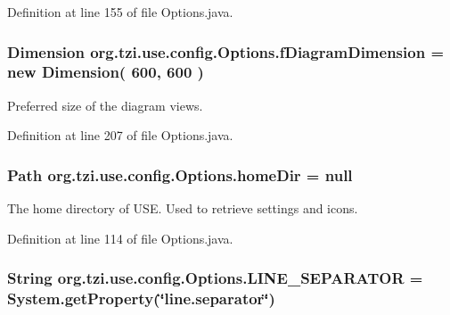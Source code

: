 Definition at line 155 of file Options.\-java.

\hypertarget{classorg_1_1tzi_1_1use_1_1config_1_1_options_a05840ffa842dd9515300f3443439d9f2}{
\subsubsection[{f\-Diagram\-Dimension}]{\setlength{\rightskip}{0pt plus 5cm}Dimension org.\-tzi.\-use.\-config.\-Options.\-f\-Diagram\-Dimension = new Dimension( 600, 600 )\hspace{0.3cm}{\ttfamily [static]}}}\label{classorg_1_1tzi_1_1use_1_1config_1_1_options_a05840ffa842dd9515300f3443439d9f2}
Preferred size of the diagram views. 

Definition at line 207 of file Options.\-java.

\hypertarget{classorg_1_1tzi_1_1use_1_1config_1_1_options_ad29865f9afb2d693e5376ca494b9d13c}{
\subsubsection[{home\-Dir}]{\setlength{\rightskip}{0pt plus 5cm}Path org.\-tzi.\-use.\-config.\-Options.\-home\-Dir = null\hspace{0.3cm}{\ttfamily [static]}}}\label{classorg_1_1tzi_1_1use_1_1config_1_1_options_ad29865f9afb2d693e5376ca494b9d13c}
The home directory of U\-S\-E. Used to retrieve settings and icons. 

Definition at line 114 of file Options.\-java.

\hypertarget{classorg_1_1tzi_1_1use_1_1config_1_1_options_a868d2a008af86654a1a01f88cc5df9ca}{
\subsubsection[{L\-I\-N\-E\-\_\-\-S\-E\-P\-A\-R\-A\-T\-O\-R}]{\setlength{\rightskip}{0pt plus 5cm}String org.\-tzi.\-use.\-config.\-Options.\-L\-I\-N\-E\-\_\-\-S\-E\-P\-A\-R\-A\-T\-O\-R = System.\-get\-Property(\char`\"{}line.\-separator\char`\"{})\hspace{0.3cm}{\ttfamily [static]}}}\label{classorg_1_1tzi_1_1use_1_1config_1_1_options_a868d2a008af86654a1a01f88cc5df9ca}


